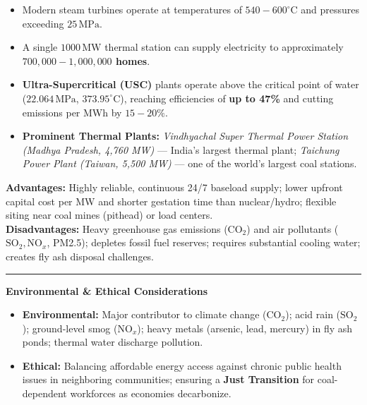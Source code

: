 \documentclass[11pt,a4paper]{article}
\newcommand{\concept}[1]{%
  \vspace{3pt}\noindent\textcolor{AnthGreen}{\rule{3.5pt}{10pt}}\enspace
  \textbf{\sffamily\color{AnthDark}#1}\par\vspace{2pt}%
}
\newenvironment{Note}[1][Note]{\begin{tcolorbox}[notebox, title=#1]}{\end{tcolorbox}}
\newenvironment{Tip}[1][Key Engineering Insight]{\begin{tcolorbox}[tipbox, title=#1]}{\end{tcolorbox}}
\begin{document}
\begin{Tip}[Thermal Engineering Benchmarks \& USC Technology]
\begin{itemize}
  \item Modern steam turbines operate at temperatures of \textbf{$540-600^\circ\text{C}$} and pressures exceeding \textbf{$25\,\text{MPa}$}.
  \item A single $1000\,\text{MW}$ thermal station can supply electricity to approximately \textbf{$700,000-1,000,000$ homes}.
  \item \textbf{Ultra-Supercritical (USC)} plants operate above the critical point of water ($22.064\,\text{MPa}$, $373.95^\circ\text{C}$), reaching efficiencies of \textbf{up to 47\%} and cutting emissions per MWh by $15-20\%$.
  \item \textbf{Prominent Thermal Plants:} \emph{Vindhyachal Super Thermal Power Station (Madhya Pradesh, 4,760 MW)} — India's largest thermal plant; \emph{Taichung Power Plant (Taiwan, 5,500 MW)} — one of the world's largest coal stations.
\end{itemize}
\end{Tip}

\begin{Note}[Advantages \& Disadvantages of Thermal Power]
\textbf{Advantages:} Highly reliable, continuous 24/7 baseload supply; lower upfront capital cost per MW and shorter gestation time than nuclear/hydro; flexible siting near coal mines (pithead) or load centers.\\
\textbf{Disadvantages:} Heavy greenhouse gas emissions ($\text{CO}_2$) and air pollutants ($\text{SO}_2, \text{NO}_x$, PM2.5); depletes fossil fuel reserves; requires substantial cooling water; creates fly ash disposal challenges.
\end{Note}

\concept{Environmental \& Ethical Considerations}
\begin{itemize}
  \item \textbf{Environmental:} Major contributor to climate change ($\text{CO}_2$); acid rain ($\text{SO}_2$); ground-level smog ($\text{NO}_x$); heavy metals (arsenic, lead, mercury) in fly ash ponds; thermal water discharge pollution.
  \item \textbf{Ethical:} Balancing affordable energy access against chronic public health issues in neighboring communities; ensuring a \textbf{Just Transition} for coal-dependent workforces as economies decarbonize.
\end{itemize}
\end{document}
